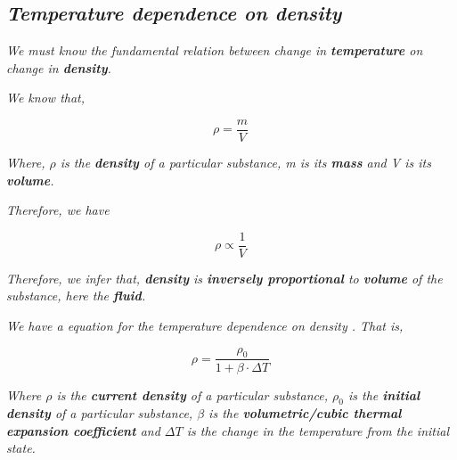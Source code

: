 
\subsection{\textit{Temperature dependence on density}}
            
	\textit{We must know the fundamental relation between change in \textbf{temperature} on change in \textbf{density}.}
            
    \textit{We know that,}
    
    		$$\rho = \frac{m}{V}$$
            
	\textit{Where, $\rho$ is the \textbf{density} of a particular substance, m is its \textbf{mass} and V is its \textbf{volume}.}            
          
	\textit{Therefore, we have}          
            
		$$\rho \propto \frac{1}{V}$$            
            
	\textit{Therefore, we infer that, \textbf{density} is \textbf{inversely proportional} to \textbf{volume} of the substance, here the \textbf{fluid}.}            
            
	\textit{We have a equation for the temperature dependence on density \cite{0}. That is,}            
            
		$$\rho = \frac{\rho_{0}}{1 + \beta\cdot\Delta T}$$            

	\textit{Where $\rho$ is the \textbf{current density} of a particular substance, $\rho_{0}$ is the \textbf{initial density} of a particular substance, $\beta$ is the \textbf{volumetric/cubic thermal expansion coefficient} and $\Delta T$ is the change in the temperature from the initial state.}            
            
            
            
            
